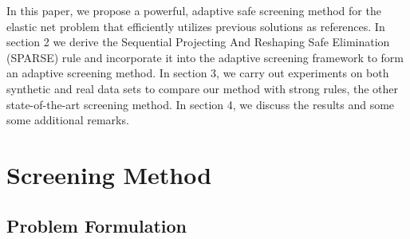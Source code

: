 In this paper, we propose a powerful, adaptive safe screening method for the elastic net problem that efficiently utilizes previous solutions as references. In section 2 we derive the Sequential Projecting And Reshaping Safe Elimination (SPARSE) rule and incorporate it into the adaptive screening framework to form an adaptive screening method. In section 3, we carry out experiments on both synthetic and real data sets to compare our method with strong rules, the other state-of-the-art screening method. In section 4, we discuss the results and some some additional remarks.

\section{Screening Method}
\subsection{Problem Formulation}
\label{sec:formulation}

